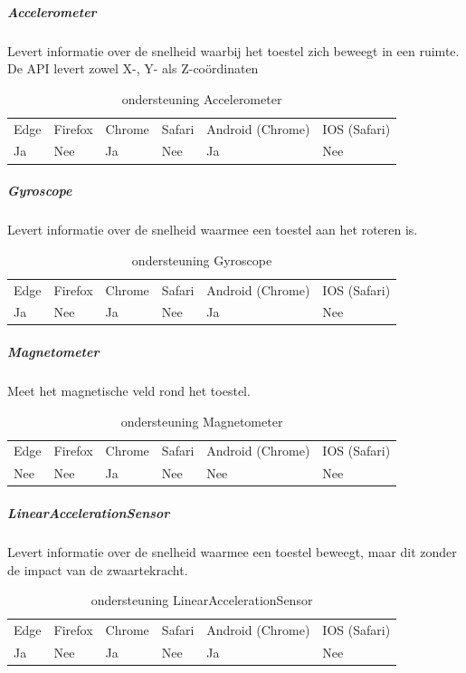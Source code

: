 	
	\subparagraph{Accelerometer  }
		Levert informatie over de snelheid waarbij het toestel zich beweegt in een ruimte. De API levert zowel X-, Y- als Z-coördinaten
		
		\begin{table}[H]
			\centering
			\begin{tabular}{llllll}
				Edge & Firefox & Chrome & Safari & Android (Chrome) & IOS (Safari) \\
				Ja   & Nee      &  Ja   & Nee     & Ja               & Nee          
			\end{tabular}	
			\caption{ondersteuning	Accelerometer   }
		\end{table}
		
		
		
	\subparagraph{Gyroscope  }
		Levert informatie over de snelheid waarmee een toestel aan het roteren is. 
			
		\begin{table}[H]
			\centering
			\begin{tabular}{llllll}
				Edge & Firefox & Chrome & Safari & Android (Chrome) & IOS (Safari) \\
				Ja   & Nee      &  Ja   & Nee     & Ja               & Nee          
			\end{tabular}	
			\caption{ondersteuning Gyroscope  }
		\end{table}
			
	\subparagraph{Magnetometer }
			Meet het magnetische veld rond het toestel. 
			
		\begin{table}[H]
			\centering
			\begin{tabular}{llllll}
				Edge & Firefox & Chrome & Safari & Android (Chrome) & IOS (Safari) \\
				Nee   & Nee      &  Ja   & Nee     & Nee               & Nee          
			\end{tabular}	
			\caption{ondersteuning Magnetometer  }
		\end{table}
			
			
	\subparagraph{LinearAccelerationSensor    }
		Levert informatie over de snelheid waarmee een toestel beweegt, maar dit zonder de impact van de zwaartekracht.
			
		\begin{table}[H]
			\centering
			\begin{tabular}{llllll}
				Edge & Firefox & Chrome & Safari & Android (Chrome) & IOS (Safari) \\
				Ja   & Nee      &  Ja   & Nee     & Ja               & Nee          
			\end{tabular}	
			\caption{ondersteuning 	LinearAccelerationSensor   }
		\end{table}
		
